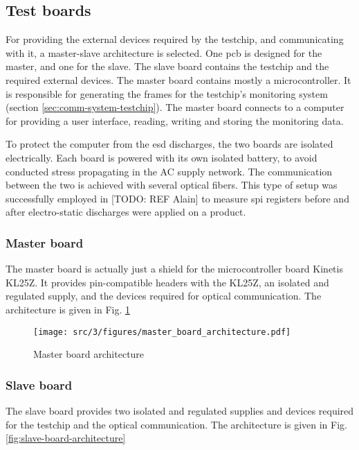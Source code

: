 \subsection{Test boards}

For providing the external devices required by the testchip, and communicating with it, a master-slave architecture is selected.
One \gls{pcb} is designed for the master, and one for the slave.
The slave board contains the testchip and the required external devices.
The master board contains mostly a microcontroller.
It is responsible for generating the frames for the testchip's monitoring system (section \ref{sec:comm-system-testchip}).
The master board connects to a computer for providing a user interface, reading, writing and storing the monitoring data.

To protect the computer from the \gls{esd} discharges, the two boards are isolated electrically.
Each board is powered with its own isolated battery, to avoid conducted stress propagating in the AC supply network.
The communication between the two is achieved with several optical fibers.
This type of setup was successfully employed in [TODO: REF Alain] to measure \gls{spi} registers before and after electro-static discharges were applied on a product.


\subsubsection{Master board}

The master board is actually just a shield for the microcontroller board Kinetis KL25Z.
It provides pin-compatible headers with the KL25Z, an isolated and regulated supply, and the devices required for optical communication.
The architecture is given in Fig. \ref{fig:master-board-architecture}

\begin{figure}[!h]
  \centering
  \texttt{[image: src/3/figures/master\_board\_architecture.pdf]}
  \caption{Master board architecture}
  \label{fig:master-board-architecture}
\end{figure}


\subsubsection{Slave board}
The slave board provides two isolated and regulated supplies and devices required for the testchip and the optical communication.
The architecture is given in Fig. \ref{fig:slave-board-architecture}

